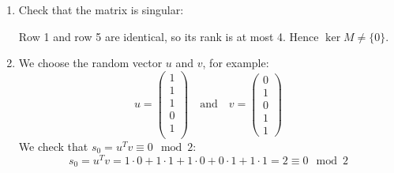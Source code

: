 \documentclass[a4paper, 11pt]{article}
\begin{document}
\begin{enumerate}
    \item Check that the matrix is singular:

    Row 1 and row 5 are identical, so its rank is at most 4. Hence $\ker M \neq \{0\}$.

    \item We choose the random vector $u$ and $v$, for example:
    \begin{equation}
        u = \begin{pmatrix}
            1 \\
            1 \\
            1 \\
            0 \\
            1 \\
        \end{pmatrix}
        \quad \text{and} \quad
        v = \begin{pmatrix}
            0 \\
            1 \\
            0 \\
            1 \\
            1
        \end{pmatrix}
    \end{equation}
    We check that $s_0=u^Tv \equiv 0 \mod 2$:
    \begin{equation}
        s_0 = u^Tv = 1 \cdot 0 + 1 \cdot 1 + 1 \cdot 0 + 0 \cdot 1 + 1 \cdot 1 = 2 \equiv 0 \mod 2
    \end{equation}


\end{enumerate}
\end{document}
